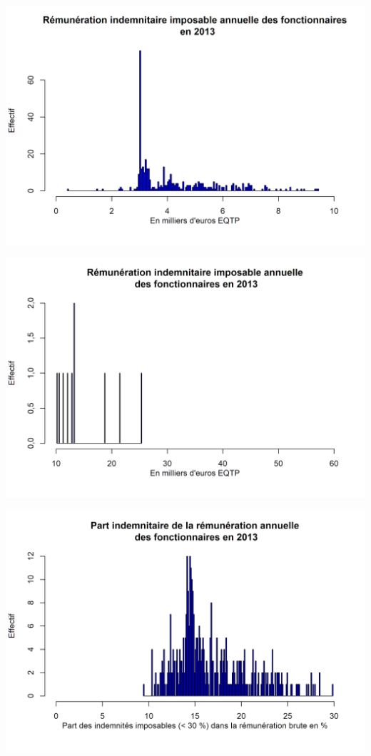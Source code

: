 \includegraphics{altair_files/figure-latex/unnamed-chunk-76-3.png}

\includegraphics{altair_files/figure-latex/unnamed-chunk-76-4.png}

\includegraphics{altair_files/figure-latex/unnamed-chunk-76-5.png}

